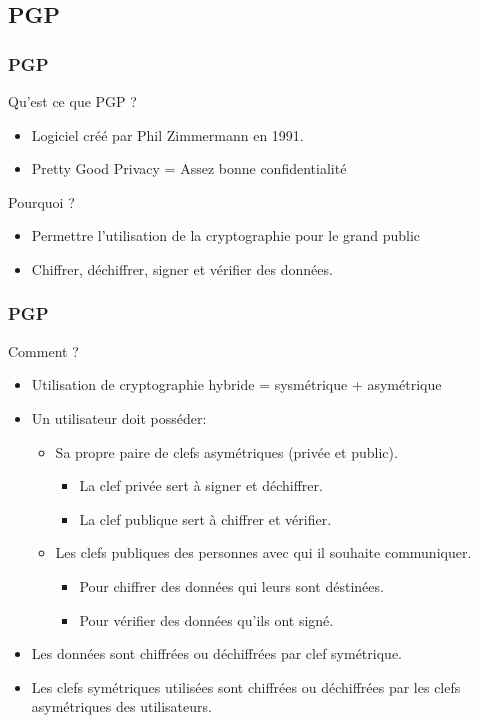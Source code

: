 \subsection{PGP}
\begin{frame}
    \frametitle{\color{white}PGP}
    \begin{block}{Qu'est ce que PGP ?}
    	\begin{itemize}
    	 \item Logiciel créé par Phil Zimmermann en 1991.
         \item Pretty Good Privacy = Assez bonne confidentialité
       \end{itemize} 
    \end{block}
    \begin{block}{Pourquoi ?}
    	\begin{itemize}
         \item Permettre l'utilisation de la cryptographie pour le grand public
         \item Chiffrer, déchiffrer, signer et vérifier des données. 
       \end{itemize} 
    \end{block}
\end{frame}
\begin{frame}
    \frametitle{\color{white}PGP}
    \begin{block}{Comment ?}
    	\begin{itemize}
         \item Utilisation de cryptographie hybride = sysmétrique + asymétrique
         \item Un utilisateur doit posséder:
	  \begin{itemize}
	    \item Sa propre paire de clefs asymétriques (privée et public).
	    \begin{itemize}
	      \item La clef privée sert à signer et déchiffrer.
	      \item La clef publique sert à chiffrer et vérifier.
	    \end{itemize}
	    \item Les clefs publiques des personnes avec qui il souhaite communiquer.
	    \begin{itemize}
	      \item Pour chiffrer des données qui leurs sont déstinées.
	      \item Pour vérifier des données qu'ils ont signé.
	    \end{itemize}
	  \end{itemize}
	  \item Les données sont chiffrées ou déchiffrées par clef symétrique.
	  \item Les clefs symétriques utilisées sont chiffrées ou déchiffrées par les clefs asymétriques des utilisateurs.
       \end{itemize} 
    \end{block}
\end{frame}

